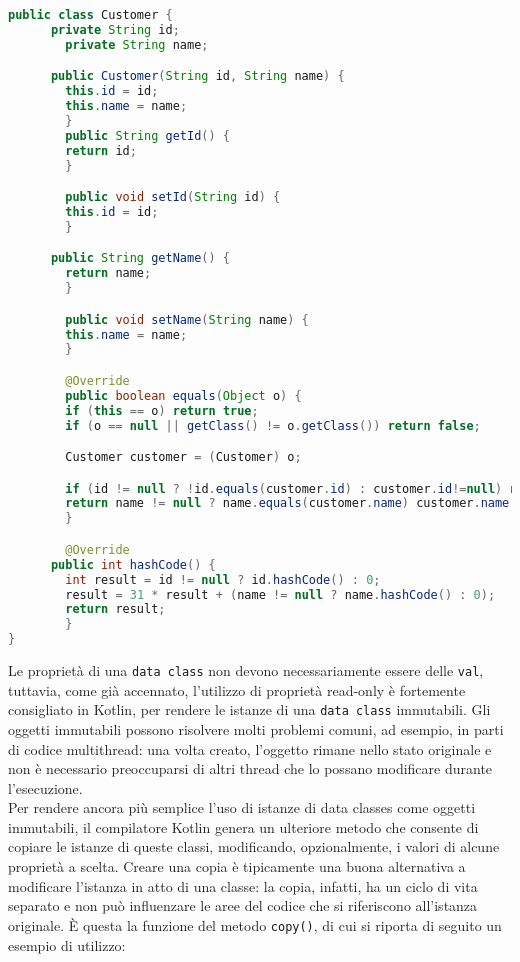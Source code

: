 \begin{lstlisting}[caption={Data Class corrispondente scritta in Java}, captionpos=b, label={lst:exampleDataClassJava}, language=Java]
public class Customer {
   	  private String id;
    	private String name;

      public Customer(String id, String name) {
        this.id = id;
        this.name = name;
    	}
    	public String getId() {
        return id;
    	}

    	public void setId(String id) {
        this.id = id;
    	}

   	  public String getName() {
        return name;
    	}

    	public void setName(String name) {
        this.name = name;
    	}

    	@Override
    	public boolean equals(Object o) {
        if (this == o) return true;
        if (o == null || getClass() != o.getClass()) return false;

        Customer customer = (Customer) o;

        if (id != null ? !id.equals(customer.id) : customer.id!=null) return false;
        return name != null ? name.equals(customer.name) customer.name == null;
    	}

    	@Override
   	  public int hashCode() {
        int result = id != null ? id.hashCode() : 0;
        result = 31 * result + (name != null ? name.hashCode() : 0);
        return result;
    	}
}
\end{lstlisting}

Le proprietà di una \texttt{data class} non devono necessariamente essere delle \texttt{val}, tuttavia, come già accennato, l’utilizzo di proprietà read-only è fortemente consigliato in Kotlin, per rendere le istanze di una \texttt{data class} immutabili. Gli oggetti immutabili possono risolvere molti problemi comuni, ad esempio, in parti di codice multithread: una volta creato, l’oggetto rimane nello stato originale e non è necessario preoccuparsi di altri thread che lo possano modificare durante l’esecuzione.\\
Per rendere ancora più semplice l'uso di istanze di data classes come oggetti immutabili, il compilatore Kotlin genera un ulteriore metodo che consente di copiare le istanze di queste classi, modificando, opzionalmente, i valori di alcune proprietà a scelta. Creare una copia è tipicamente una buona alternativa a modificare l'istanza in atto di una classe: la copia, infatti, ha un ciclo di vita separato e non può influenzare le aree del codice che si riferiscono all'istanza originale. È questa la funzione del metodo \texttt{copy()}, di cui si riporta di seguito un esempio di utilizzo:\\
\\

